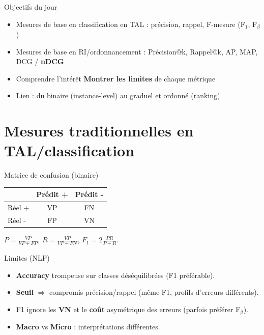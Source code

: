
\begin{frame}{Objectifs du jour}
\begin{itemize}
  \item Mesures de base en classification en TAL : précision, rappel, F-mesure (F$_1$, F$_\beta$)
	  \pause
  \item Mesures de base en RI/ordonnancement : Précision@k, Rappel@k, AP, MAP, DCG / \textbf{nDCG}
	  \pause
  \item Comprendre l'intérêt \textbf{Montrer les limites} de chaque métrique
  \item Lien : du binaire (instance-level) au graduel et ordonné (ranking)
\end{itemize}
\end{frame}

\section{Mesures traditionnelles en TAL/classification}

\begin{frame}{Matrice de confusion (binaire)}
\begin{center}
\begin{tabular}{lcc}
\toprule
 & Prédit + & Prédit - \\
\midrule
Réel + & VP & FN \\
Réel - & FP & VN \\
\bottomrule
\end{tabular}
\end{center}

\vspace{0.6em}
$P=\frac{VP}{VP+FP}$, \quad $R=\frac{VP}{VP+FN}$, \quad $F_1=2\frac{PR}{P+R}$.
\end{frame}

\begin{frame}{Limites (NLP)}
\begin{itemize}
  \item \textbf{Accuracy} trompeuse sur classes déséquilibrées (F1 préférable).
  \item \textbf{Seuil} $\Rightarrow$ compromis précision/rappel (même F1, profils d'erreurs différents).
	  \pause
  \item F1 ignore les \textbf{VN} et le \textbf{coût} asymétrique des erreurs (parfois préférer F$_\beta$).
	  \pause
  \item \textbf{Macro} vs \textbf{Micro} : interprétations différentes.
\end{itemize}
\end{frame}

